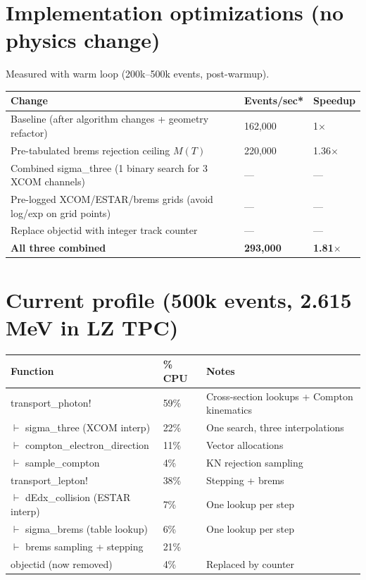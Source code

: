 \documentclass{article}
\begin{document}
\section{Implementation optimizations (no physics change)}

Measured with warm loop (200k--500k events, post-warmup).

\begin{table}[htbp]
\centering
\begin{tabular}{@{}lll@{}}
\toprule
Change & Events/sec* & Speedup \\
\midrule
Baseline (after algorithm changes + geometry refactor)
  & 162{,}000 & 1$\times$ \\
Pre-tabulated brems rejection ceiling $M(T)$
  & 220{,}000 & 1.36$\times$ \\
Combined sigma\_three (1 binary search for 3 XCOM channels)
  & --- & --- \\
Pre-logged XCOM/ESTAR/brems grids (avoid log/exp on grid points)
  & --- & --- \\
Replace objectid with integer track counter
  & --- & --- \\
\textbf{All three combined}
  & \textbf{293{,}000} & \textbf{1.81$\times$} \\
\bottomrule
\end{tabular}
\end{table}

\section{Current profile (500k events, 2.615\,MeV in LZ TPC)}

\begin{table}[htbp]
\centering
\begin{tabular}{@{}lll@{}}
\toprule
Function & \% CPU & Notes \\
\midrule
transport\_photon! & 59\% & Cross-section lookups + Compton kinematics \\
\quad$\vdash$ sigma\_three (XCOM interp) & 22\% & One search, three interpolations \\
\quad$\vdash$ compton\_electron\_direction & 11\% & Vector allocations \\
\quad$\vdash$ sample\_compton & 4\% & KN rejection sampling \\
transport\_lepton! & 38\% & Stepping + brems \\
\quad$\vdash$ dEdx\_collision (ESTAR interp) & 7\% & One lookup per step \\
\quad$\vdash$ sigma\_brems (table lookup) & 6\% & One lookup per step \\
\quad$\vdash$ brems sampling + stepping & 21\% & \\
objectid (now removed) & 4\% & Replaced by counter \\
\bottomrule
\end{tabular}
\end{table}
\end{document}
